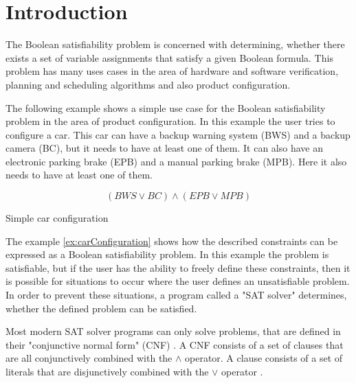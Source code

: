 
\chapter{Introduction}
\label{ch:Introduction}

The Boolean satisfiability problem is concerned with determining, whether there exists a set of variable assignments that satisfy a given Boolean formula. This problem has many uses cases in the area of hardware and software verification, planning and scheduling algorithms and also product configuration. \cite{biere2009handbook}

The following example shows a simple use case for the Boolean satisfiability problem in the area of product configuration. In this example the user tries to configure a car. This car can have a backup warning system (BWS) and a backup camera (BC), but it needs to have at least one of them. It can also have an electronic parking brake (EPB) and a manual parking brake (MPB). Here it also needs to have at least one of them.
\begin{example}
\begin{leftbar}
\begin{displaymath}
(BWS \vee BC) \wedge (EPB \vee MPB)
\end{displaymath}
\end{leftbar}
\caption{Simple car configuration}
\label{ex:carConfiguration}
\end{example}

The example \ref{ex:carConfiguration} shows how the described constraints can be expressed as a Boolean satisfiability problem. In this example the problem is satisfiable, but if the user has the ability to freely define these constraints, then it is possible for situations to occur where the user defines an unsatisfiable problem. In order to prevent these situations, a program called a "SAT solver" determines, whether the defined problem can be satisfied.

Most modern SAT solver programs can only solve problems, that are defined in their "conjunctive normal form" (CNF) \cite{biere2009handbook}. A CNF consists of a set of clauses that are all conjunctively combined with the $\wedge$ operator. A clause consists of a set of literals that are disjunctively combined with the $\vee$ operator \cite{biere2009handbook}.


